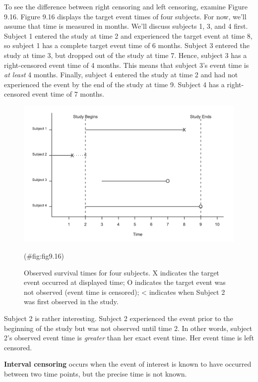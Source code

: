 \documentclass[
]{report}
\begin{document}
To see the difference between right censoring and left censoring, examine Figure 9.16. Figure 9.16 displays the target event times of four subjects. For now, we'll assume that time is measured in months. We'll discuss subjects 1, 3, and 4 first. Subject 1 entered the study at time 2 and experienced the target event at time 8, so subject 1 has a complete target event time of 6 months. Subject 3 entered the study at time 3, but dropped out of the study at time 7. Hence, subject 3 has a right-censored event time of 4 months. This means that subject 3's event time is \emph{at least} 4 months. Finally, subject 4 entered the study at time 2 and had not experienced the event by the end of the study at time 9. Subject 4 has a right-censored event time of 7 months.

\begin{figure}

{\centering \includegraphics[width=1\linewidth]{docs/Fig9_16} 

}

\caption{Observed survival times for four subjects. X indicates the target event occurred at displayed time; O indicates the target event was not observed (event time is censored); < indicates when Subject 2 was first observed in the study.}(\#fig:fig9.16)
\end{figure}

Subject 2 is rather interesting. Subject 2 experienced the event prior to the beginning of the study but was not observed until time 2. In other words, subject 2's observed event time is \emph{greater} than her exact event time. Her event time is left censored.

\textbf{Interval censoring} occurs when the event of interest is known to have occurred between two time points, but the precise time is not known.
\end{document}
